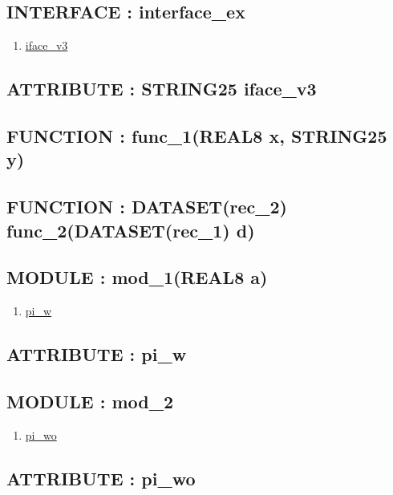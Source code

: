 \subsection*{INTERFACE : interface\_ex}
\hypertarget{ecldoc:example_example.interface_ex}{}
\begin{enumerate}
\item \hyperlink{ecldoc:example_example.interface_ex.iface_v3}{iface\_v3}
\end{enumerate}
\subsection*{ATTRIBUTE : STRING25 iface\_v3}
\hypertarget{ecldoc:example_example.interface_ex.iface_v3}{}

\subsection*{FUNCTION : func\_1(REAL8 x, STRING25 y)}
\hypertarget{ecldoc:example_example.func_1}{}
\subsection*{FUNCTION : DATASET(rec\_2) func\_2(DATASET(rec\_1) d)}
\hypertarget{ecldoc:example_example.func_2}{}
\subsection*{MODULE : mod\_1(REAL8 a)}
\hypertarget{ecldoc:example_example.mod_1}{}
\begin{enumerate}
\item \hyperlink{ecldoc:example_example.mod_1.pi_w}{pi\_w}
\end{enumerate}
\subsection*{ATTRIBUTE : pi\_w}
\hypertarget{ecldoc:example_example.mod_1.pi_w}{}

\subsection*{MODULE : mod\_2}
\hypertarget{ecldoc:example_example.mod_2}{}
\begin{enumerate}
\item \hyperlink{ecldoc:example_example.mod_2.pi_wo}{pi\_wo}
\end{enumerate}
\subsection*{ATTRIBUTE : pi\_wo}
\hypertarget{ecldoc:example_example.mod_2.pi_wo}{}

